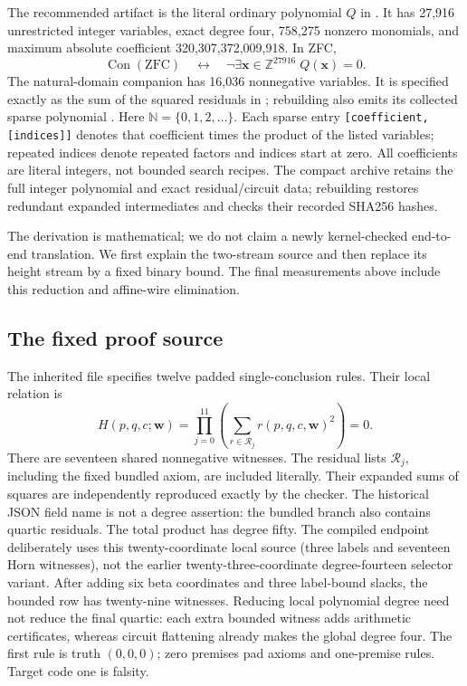 \documentclass[11pt]{article}
\begin{document}
The recommended artifact is the literal ordinary polynomial $Q$ in
. It has 27,916 unrestricted
integer variables, exact degree four, 758,275 nonzero monomials, and
maximum absolute coefficient 320,307,372,009,918. In ZFC,
\[
 \operatorname{Con}(\mathrm{ZFC})\quad\longleftrightarrow\quad
 \neg\exists\boldsymbol{x}\in\mathbb Z^{27916}\;Q(\boldsymbol{x})=0.
\]
The natural-domain companion has 16,036 nonnegative variables. It is
specified exactly as the sum of the squared residuals in
; rebuilding also emits its
collected sparse polynomial . Here
$\mathbb N=\{0,1,2,\ldots\}$. Each sparse entry
\texttt{[coefficient,[indices]]} denotes that coefficient times the product
of the listed variables; repeated indices denote repeated factors and
indices start at zero. All coefficients are literal integers, not bounded
search recipes. The compact archive retains the full integer polynomial
and exact residual/circuit data; rebuilding restores redundant expanded
intermediates and checks their recorded SHA256 hashes.

The derivation is mathematical; we do not claim a newly kernel-checked
end-to-end translation. We first explain the two-stream source and then
replace its height stream by a fixed binary bound. The final measurements
above include this reduction and affine-wire elimination.

\subsection{The fixed proof source}

The inherited file  specifies twelve
padded single-conclusion rules. Their local relation is
\[
 H(p,q,c;\boldsymbol w)=\prod_{j=0}^{11}
             \left(\sum_{r\in\mathcal R_j}r(p,q,c,\boldsymbol w)^2\right)=0.
\]
There are seventeen shared nonnegative witnesses. The residual lists
$\mathcal R_j$, including the fixed bundled axiom, are included literally.
Their expanded sums of squares are independently reproduced exactly by
the checker. The historical JSON field name
 is not a degree assertion: the bundled branch
also contains quartic residuals. The total product has degree fifty. The compiled endpoint deliberately uses
this twenty-coordinate local source (three labels and seventeen Horn witnesses),
not the earlier twenty-three-coordinate degree-fourteen selector variant.
After adding six beta coordinates and three label-bound slacks, the bounded
row has twenty-nine witnesses. Reducing local polynomial degree need not
reduce the final quartic: each extra bounded witness adds arithmetic
certificates, whereas circuit flattening already makes the global degree four.
The first rule is truth $(0,0,0)$; zero premises pad axioms and one-premise
rules. Target code one is falsity.
\end{document}
